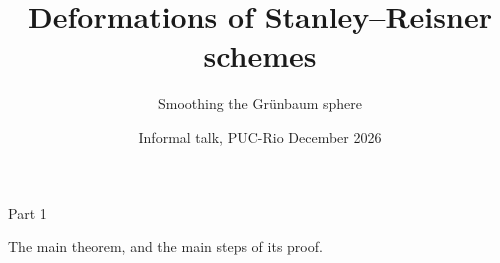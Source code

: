 
\title{Deformations of Stanley--Reisner schemes}
\subtitle{Smoothing the Grünbaum sphere}
\date{Informal talk, PUC-Rio  December 2026}
\usepackage{array}
\newcommand{\partslide}[3]{\begin{frame}\centering
{\large Part #1}\par\medskip{\huge #2\par}\par\vspace{6mm}
\begin{minipage}{0.78\textwidth}\centering #3\end{minipage}\end{frame}}
\newcommand{\linkofb}[1]{\begin{tikzpicture}[scale=#1,line join=round]
\coordinate (g) at (0,3.3);
\coordinate (f) at (-3.7,-2.3);
\coordinate (h) at (3.7,-2.3);
\coordinate (c) at (0,1.3);
\coordinate (e) at (-1.3,-1.2);
\coordinate (d) at (0.9,-0.9);
\coordinate (a) at (-0.13,-0.27);
\draw (f)--(g)--(h)--cycle;
\draw (c)--(f) (c)--(g) (c)--(h) (c)--(e) (c)--(d) (c)--(a);
\draw (e)--(f) (d)--(h) (d)--(e) (a)--(d) (a)--(e) (e)--(h);
\foreach \p/\pos in {g/above,f/below left,h/below right,c/above right,e/below left,d/right,a/below}
  \fill (\p) circle (1.5pt) node[\pos]{\(\p\)};
\end{tikzpicture}}

\begin{frame}\titlepage
\vfill{}
\end{frame}

\partslide{1}{What I will do}{The main theorem, and the main steps of its proof.}

